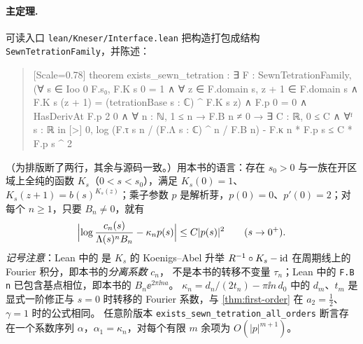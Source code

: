 \paragraph{主定理.} 可读入口 \texttt{lean/Kneser/Interface.lean} 把构造打包成结构 \texttt{SewnTetrationFamily}，并陈述：
\begin{quote}
\begingroup{}[Scale=0.78]\setlength{\parindent}{0pt}\setlength{\parskip}{0pt}%
\def\T#1{\hspace*{#1\fontcharwd\font`\x}}%
\obeylines
theorem exists\_sewn\_tetration :
\T{4}∃ F : SewnTetrationFamily,
\T{6}(∀ s ∈ Ioo 0 F.s₀, F.K s 0 = 1 ∧
\T{8}∀ z ∈ F.domain s, z + 1 ∈ F.domain s ∧
\T{10}F.K s (z + 1) = (tetrationBase s : ℂ) \textasciicircum{} F.K s z) ∧
\T{6}F.p 0 = 0 ∧ HasDerivAt F.p 2 0 ∧
\T{6}∀ n : ℕ, 1 ≤ n → F.B n ≠ 0 → ∃ C : ℝ, 0 ≤ C ∧ ∀ᶠ s : ℝ in [>] 0,
\T{8}log (F.τ s n / (F.Λ s : ℂ) \textasciicircum{} n / F.B n) - F.κ n * F.p s
\T{10}≤ C * F.p s \textasciicircum{} 2
\endgroup
\end{quote}
（为排版断了两行，其余与源码一致。）用本书的语言：存在 $s_0>0$ 与一族在开区域上全纯的函数 $K_s$（$0<s<s_0$），满足 $K_s(0)=1$、
$K_s(z+1)=b(s)^{K_s(z)}$；乘子参数 $p$ 是解析芽，$p(0)=0$、$p'(0)=2$；对每个 $n\ge1$，只要 $B_n\ne0$，就有
\[
 \Bigl|\log\frac{c_n(s)}{\Lambda(s)^nB_n}-\kappa_np(s)\Bigr|\le C|p(s)|^2\qquad(s\to0^+) .
\]
\emph{记号注意}：Lean 中的  是 $K_s$ 的 Koenigs--Abel 升举 $R^{-1}\circ K_s-\mathrm{id}$ 在周期线上的 Fourier 积分，即本书的\emph{分离系数} $c_n$，
不是本书的转移不变量 $\tau_n$；Lean 中的 \texttt{F.B n} 已包含基点相位，即本书的 $B_n\ee^{2\pi\ii na}$。
$\kappa_n=d_n/(2t_n)-\pi\ii n\,d_0$ 中的 $d_m$、$t_m$ 是显式一阶修正与 $s=0$ 时转移的 Fourier 系数，与 \cref{thm:first-order} 在 $a_2=\tfrac12$、$\gamma=1$ 时的公式相同。
任意阶版本 \texttt{exists\_\allowbreak{}sewn\_\allowbreak{}tetration\_\allowbreak{}all\_\allowbreak{}orders} 断言存在一个系数序列 $\alpha$，$\alpha_1=\kappa_n$，对每个有限 $m$ 余项为 $O(|p|^{m+1})$。

